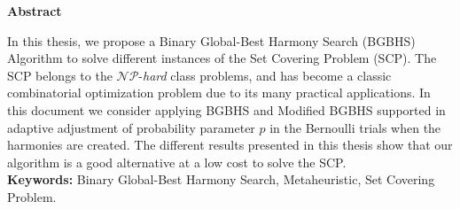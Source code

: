\noindent
\Large{\textbf{Abstract}}\\

\normalsize

In this thesis, we propose a Binary Global-Best Harmony Search (BGBHS)  Algorithm to solve different instances of the Set Covering Problem (SCP). The SCP belongs to the $\mathcal{N} \mathcal{P}$-\textit{hard} class problems, and has become a classic combinatorial optimization problem due to its many practical applications. In this document we consider applying  BGBHS and Modified BGBHS supported in adaptive adjustment of probability parameter $p$ in the Bernoulli trials when the harmonies are created. The different results presented in this thesis show that our algorithm is a good alternative at a low cost to solve the SCP.\\


\textbf{Keywords:} Binary Global-Best Harmony Search, Metaheuristic, Set Covering Problem.